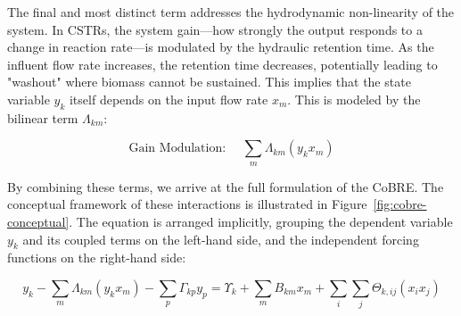 \documentclass{article}
\begin{document}
The final and most distinct term addresses the hydrodynamic non-linearity of the system. In CSTRs, the system gain—how strongly the output responds to a change in reaction rate—is modulated by the hydraulic retention time. As the influent flow rate increases, the retention time decreases, potentially leading to "washout" where biomass cannot be sustained. This implies that the state variable $y_{k}$ itself depends on the input flow rate $x_{m}$. This is modeled by the bilinear term $\Lambda_{km}$:

\begin{equation}
\text{Gain Modulation: } \quad \sum_{m} \Lambda_{km} (y_{k} x_{m})
\end{equation}

By combining these terms, we arrive at the full formulation of the CoBRE. The conceptual framework of these interactions is illustrated in Figure~\ref{fig:cobre-conceptual}. The equation is arranged implicitly, grouping the dependent variable $y_{k}$ and its coupled terms on the left-hand side, and the independent forcing functions on the right-hand side:

\begin{equation}
y_{k} - \sum_{m} \Lambda_{km} (y_{k} x_{m}) - \sum_{p} \Gamma_{kp} y_{p} = \Upsilon_{k} + \sum_{m} B_{km} x_{m} + \sum_{i} \sum_{j} \Theta_{k,ij} (x_{i} x_{j})
\end{equation}
\end{document}
